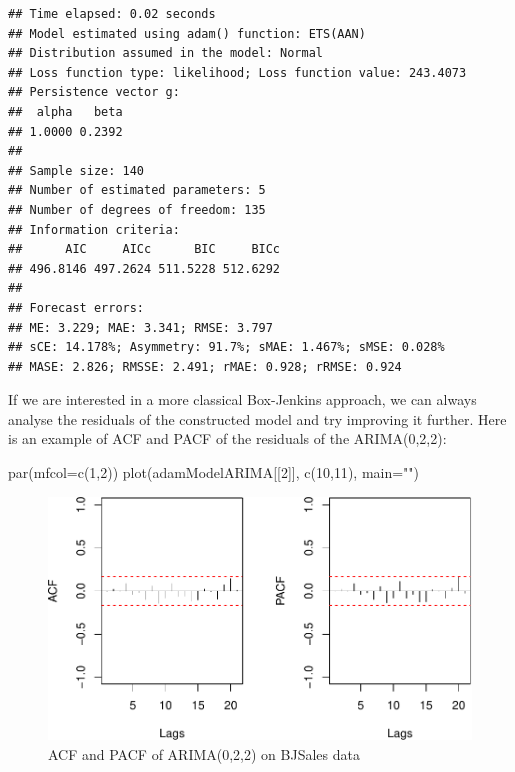 \documentclass[
]{book}
\newenvironment{Shaded}{\begin{snugshade}}{\end{snugshade}}
\newcommand{\AttributeTok}[1]{\textcolor[rgb]{0.77,0.63,0.00}{#1}}
\newcommand{\DecValTok}[1]{\textcolor[rgb]{0.00,0.00,0.81}{#1}}
\newcommand{\FunctionTok}[1]{\textcolor[rgb]{0.00,0.00,0.00}{#1}}
\newcommand{\NormalTok}[1]{#1}
\newcommand{\StringTok}[1]{\textcolor[rgb]{0.31,0.60,0.02}{#1}}
\theoremstyle{definition}
\theoremstyle{definition}
\theoremstyle{definition}
\theoremstyle{definition}
\theoremstyle{remark}
\begin{document}
\begin{verbatim}
## Time elapsed: 0.02 seconds
## Model estimated using adam() function: ETS(AAN)
## Distribution assumed in the model: Normal
## Loss function type: likelihood; Loss function value: 243.4073
## Persistence vector g:
##  alpha   beta 
## 1.0000 0.2392 
## 
## Sample size: 140
## Number of estimated parameters: 5
## Number of degrees of freedom: 135
## Information criteria:
##      AIC     AICc      BIC     BICc 
## 496.8146 497.2624 511.5228 512.6292 
## 
## Forecast errors:
## ME: 3.229; MAE: 3.341; RMSE: 3.797
## sCE: 14.178%; Asymmetry: 91.7%; sMAE: 1.467%; sMSE: 0.028%
## MASE: 2.826; RMSSE: 2.491; rMAE: 0.928; rRMSE: 0.924
\end{verbatim}

If we are interested in a more classical Box-Jenkins approach, we can always analyse the residuals of the constructed model and try improving it further. Here is an example of ACF and PACF of the residuals of the ARIMA(0,2,2):

\begin{Shaded}
\begin{Highlighting}[]
\FunctionTok{par}\NormalTok{(}\AttributeTok{mfcol=}\FunctionTok{c}\NormalTok{(}\DecValTok{1}\NormalTok{,}\DecValTok{2}\NormalTok{))}
\FunctionTok{plot}\NormalTok{(adamModelARIMA[[}\DecValTok{2}\NormalTok{]], }\FunctionTok{c}\NormalTok{(}\DecValTok{10}\NormalTok{,}\DecValTok{11}\NormalTok{), }\AttributeTok{main=}\StringTok{""}\NormalTok{)}
\end{Highlighting}
\end{Shaded}

\begin{figure}
\centering
\includegraphics{Svetunkov--2022----ADAM_files/figure-latex/adamARIMAPlotBJSalesACFPACF-1.pdf}
\caption{\label{fig:adamARIMAPlotBJSalesACFPACF}ACF and PACF of ARIMA(0,2,2) on BJSales data}
\end{figure}
\end{document}
